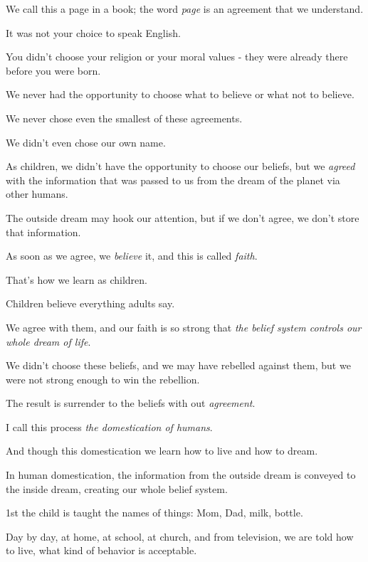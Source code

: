 \documentclass{article}
\numberwithin{equation}{section}
\begin{document}
We call this a page in a book; the word \textit{page} is an agreement that we understand.


%
It was not your choice to speak English.

You didn't choose your religion or your moral values - they were already there before you were born.

We never had the opportunity to choose what to believe or what not to believe.

We never chose even the smallest of these agreements.

We didn't even chose our own name.

%
As children, we didn't have the opportunity to choose our beliefs, but we \textit{agreed} with the information that was passed to us from the dream of the planet via other humans.


The outside dream may hook our attention, but if we don't agree, we don't store that information.

As soon as we agree, we \textit{believe} it, and this is called \textit{faith}.


%
That's how we learn as children.

Children believe everything adults say.

We agree with them, and our faith is so strong that \textit{the belief system controls our whole dream of life}.

We didn't choose these beliefs, and we may have rebelled against them, but we were not strong enough to win the rebellion.

The result is surrender to the beliefs with out \textit{agreement}.

%
I call this process \textit{the domestication of humans}.

And though this domestication we learn how to live and how to dream.

In human domestication, the information from the outside dream is conveyed to the inside dream, creating our whole belief system.

1st the child is taught the names of things: Mom, Dad, milk, bottle.

Day by day, at home, at school, at church, and from television, we are told how to live, what kind of behavior is acceptable.
\end{document}
